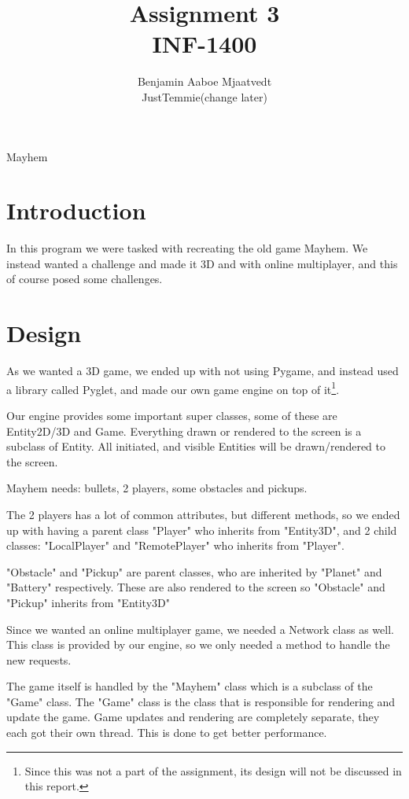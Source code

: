 \documentclass[journal]{IEEEtran}
\begin{document}
\title{Assignment 3\\ INF-1400}

\author{Benjamin Aaboe Mjaatvedt\\ JustTemmie(change later)}
%
{Mayhem}


\maketitle

\section{Introduction} \label{Section:Introduction}
In this program we were tasked with recreating the old game Mayhem. We instead wanted a challenge and made it 3D and with online multiplayer, and this of course posed some challenges.
\section{Design}\label{Section:Design}
As we wanted a 3D game, we ended up with not using Pygame, and instead used a library called Pyglet, and made our own game engine on top of it\footnote{Since this was not a part of the assignment, its design will not be discussed in this report.}.

Our engine provides some important super classes, some of these are Entity2D/3D and Game. Everything drawn or rendered to the screen is a subclass of Entity. All initiated, and visible Entities will be drawn/rendered to the screen. 

Mayhem needs: bullets, 2 players, some obstacles and pickups.

The 2 players has a lot of common attributes, but different methods, so we ended up with having a parent class "Player" who inherits from "Entity3D", and 2 child classes: "LocalPlayer" and "RemotePlayer" who inherits from "Player".

"Obstacle" and "Pickup" are parent classes, who are inherited by "Planet" and "Battery" respectively. These are also rendered to the screen so "Obstacle" and "Pickup" inherits from "Entity3D"

Since we wanted an online multiplayer game, we needed a Network class as well. This class is provided by our engine, so we only needed a method to handle the new requests.

The game itself is handled by the "Mayhem" class which is a subclass of the "Game" class. The "Game" class is the class that is responsible for rendering and update the game. Game updates and rendering are completely separate, they each got their own thread. This is done to get better performance.
\end{document}
